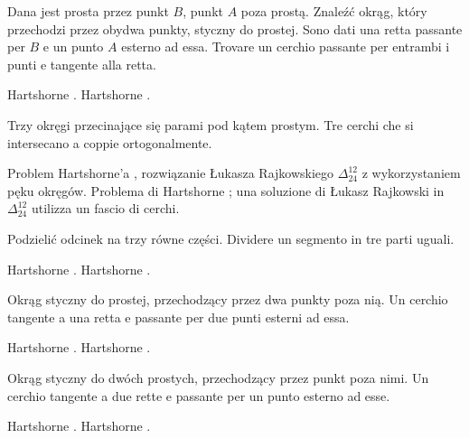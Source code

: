 \begin{problem}
    Dana jest prosta przez punkt $B$, punkt $A$ poza prostą. %
    Znaleźć okrąg, który przechodzi przez obydwa punkty, styczny do prostej. %
    Sono dati una retta passante per $B$ e un punto $A$ esterno ad essa. %
    Trovare un cerchio passante per entrambi i punti e tangente alla retta. %
\end{problem}

Hartshorne \cite[s. 25]{hartshorne_2000}. %
Hartshorne \cite[p. 25]{hartshorne_2000}. %

\begin{problem}
    Trzy okręgi przecinające się parami pod kątem prostym. %
    Tre cerchi che si intersecano a coppie ortogonalmente. %
\end{problem}

Problem Hartshorne'a \cite[s. 25]{hartshorne_2000}, rozwiązanie Łukasza Rajkowskiego $\Delta_{24}^{12}$ z wykorzystaniem pęku okręgów. %
Problema di Hartshorne \cite[p. 25]{hartshorne_2000}; una soluzione di Łukasz Rajkowski in $\Delta_{24}^{12}$ utilizza un fascio di cerchi. %

\begin{problem}
    Podzielić odcinek na trzy równe części. %
    Dividere un segmento in tre parti uguali. %
\end{problem}

Hartshorne \cite[s. 25]{hartshorne_2000}. %
Hartshorne \cite[p. 25]{hartshorne_2000}. %

\begin{problem}
    Okrąg styczny do prostej, przechodzący przez dwa punkty poza nią. %
    Un cerchio tangente a una retta e passante per due punti esterni ad essa. %
\end{problem}

Hartshorne \cite[s. 43]{hartshorne_2000}. %
Hartshorne \cite[p. 43]{hartshorne_2000}. %

\begin{problem}
    Okrąg styczny do dwóch prostych, przechodzący przez punkt poza nimi. %
    Un cerchio tangente a due rette e passante per un punto esterno ad esse. %
\end{problem}

Hartshorne \cite[s. 44]{hartshorne_2000}. %
Hartshorne \cite[p. 44]{hartshorne_2000}. %

